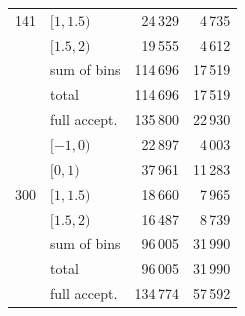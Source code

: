 \documentclass[reprint,amsmath,amssymb,aps,prd,floatfix]{revtex4-2}
\begin{document}
\begin{table}[htbp]
\begin{ruledtabular}
\begin{tabular}{llrr}
141 & $[1, 1.5)$   & 24\,329 & 4\,735 \\
    & $[1.5, 2)$   & 19\,555 & 4\,612 \\
    & sum of bins  & 114\,696 & 17\,519 \\
    & total        & 114\,696 & 17\,519 \\
    & full accept. & 135\,800 & 22\,930 \\
\colrule
    & $[-1, 0)$    & 22\,897 & 4\,003 \\
    & $[0, 1)$     & 37\,961 & 11\,283 \\
300 & $[1, 1.5)$   & 18\,660 & 7\,965 \\
    & $[1.5, 2)$   & 16\,487 & 8\,739 \\
    & sum of bins  & 96\,005 & 31\,990 \\
    & total        & 96\,005 & 31\,990 \\
    & full accept. & 134\,774 & 57\,592 \\
\end{tabular}
\end{ruledtabular}
\end{table}
\end{document}
